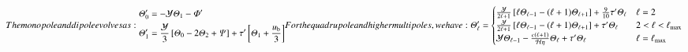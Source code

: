 \begin{subequations}\label{app:pert:eq:photon_multipoles}
The monopole and dipole evolves as:
\begin{align}
    \Theta_0' &= -\ckH \Theta_1 - \Phi ' \label{app:pert:eq:dTheta0dx}\\
    \Theta_1' &= \frac{\ckH}{3} \left[ \Theta_0 - 2\Theta_2 + \Psi \right] + \tau'\left[\Theta_1 + \frac{u\ped{b}}{3} \right] \label{app:pert:eq:dTheta1dx}
\end{align}
For the quadrupole and higher multipoles, we have:
\begin{align}
\Theta_\ell' = \begin{cases}
    \frac{\ckH}{2\ell + 1} \left[ \ell \Theta_{\ell-1}-  (\ell+1) \Theta_{\ell+1} \right] + \frac{9}{10}\tau ' \Theta_\ell & \ell = 2 \\ 
    \frac{\ckH}{2\ell + 1} \left[ \ell \Theta_{\ell-1}-  (\ell+1) \Theta_{\ell+1} \right] + \tau ' \Theta_\ell  & 2< \ell < \ell\ped{max} \\
    \ckH \Theta_{\ell-1} - \frac{c(\ell+1)}{\Hp \eta}\Theta_{\ell} + \tau' \Theta_{\ell}& \ell=\ell\ped{max}
\end{cases} \label{app:pert:eq:dThetaelldx}
\end{align}
\end{subequations}




